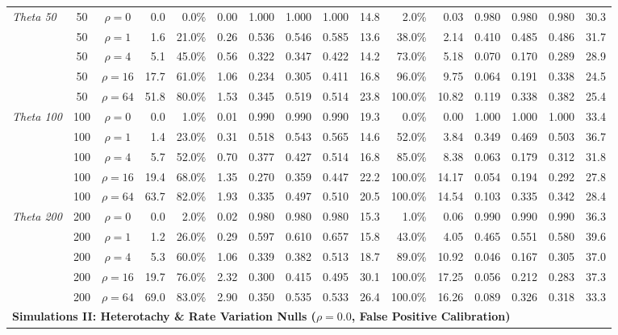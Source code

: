 \begin{table}[t!]
\begin{tabular*}{\textwidth}{@{\extracolsep{\fill}} l c c r rrrrrr rrrrrr @{}}
\addlinespace
\textit{Theta 50} & 50 & $\rho = 0$ & 0.0 & 0.0\% & 0.00 & 1.000 & 1.000 & 1.000 & 14.8 & 2.0\% & 0.03 & 0.980 & 0.980 & 0.980 & 30.3 \\
& 50 & $\rho = 1$ & 1.6 & 21.0\% & 0.26 & 0.536 & 0.546 & 0.585 & 13.6 & 38.0\% & 2.14 & 0.410 & 0.485 & 0.486 & 31.7 \\
& 50 & $\rho = 4$ & 5.1 & 45.0\% & 0.56 & 0.322 & 0.347 & 0.422 & 14.2 & 73.0\% & 5.18 & 0.070 & 0.170 & 0.289 & 28.9 \\
& 50 & $\rho = 16$ & 17.7 & 61.0\% & 1.06 & 0.234 & 0.305 & 0.411 & 16.8 & 96.0\% & 9.75 & 0.064 & 0.191 & 0.338 & 24.5 \\
& 50 & $\rho = 64$ & 51.8 & 80.0\% & 1.53 & 0.345 & 0.519 & 0.514 & 23.8 & 100.0\% & 10.82 & 0.119 & 0.338 & 0.382 & 25.4 \\
\addlinespace
\textit{Theta 100} & 100 & $\rho = 0$ & 0.0 & 1.0\% & 0.01 & 0.990 & 0.990 & 0.990 & 19.3 & 0.0\% & 0.00 & 1.000 & 1.000 & 1.000 & 33.4 \\
& 100 & $\rho = 1$ & 1.4 & 23.0\% & 0.31 & 0.518 & 0.543 & 0.565 & 14.6 & 52.0\% & 3.84 & 0.349 & 0.469 & 0.503 & 36.7 \\
& 100 & $\rho = 4$ & 5.7 & 52.0\% & 0.70 & 0.377 & 0.427 & 0.514 & 16.8 & 85.0\% & 8.38 & 0.063 & 0.179 & 0.312 & 31.8 \\
& 100 & $\rho = 16$ & 19.4 & 68.0\% & 1.35 & 0.270 & 0.359 & 0.447 & 22.2 & 100.0\% & 14.17 & 0.054 & 0.194 & 0.292 & 27.8 \\
& 100 & $\rho = 64$ & 63.7 & 82.0\% & 1.93 & 0.335 & 0.497 & 0.510 & 20.5 & 100.0\% & 14.54 & 0.103 & 0.335 & 0.342 & 28.4 \\
\addlinespace
\textit{Theta 200} & 200 & $\rho = 0$ & 0.0 & 2.0\% & 0.02 & 0.980 & 0.980 & 0.980 & 15.3 & 1.0\% & 0.06 & 0.990 & 0.990 & 0.990 & 36.3 \\
& 200 & $\rho = 1$ & 1.2 & 26.0\% & 0.29 & 0.597 & 0.610 & 0.657 & 15.8 & 43.0\% & 4.05 & 0.465 & 0.551 & 0.580 & 39.6 \\
& 200 & $\rho = 4$ & 5.3 & 60.0\% & 1.06 & 0.339 & 0.382 & 0.513 & 18.7 & 89.0\% & 10.92 & 0.046 & 0.167 & 0.305 & 37.0 \\
& 200 & $\rho = 16$ & 19.7 & 76.0\% & 2.32 & 0.300 & 0.415 & 0.495 & 30.1 & 100.0\% & 17.25 & 0.056 & 0.212 & 0.283 & 37.3 \\
& 200 & $\rho = 64$ & 69.0 & 83.0\% & 2.90 & 0.350 & 0.535 & 0.533 & 26.4 & 100.0\% & 16.26 & 0.089 & 0.326 & 0.318 & 33.3 \\
\midrule
\multicolumn{16}{l}{\textbf{Simulations II: Heterotachy \& Rate Variation Nulls ($\rho = 0.0$, False Positive Calibration)}} \\

\end{tabular*}
\end{table}
